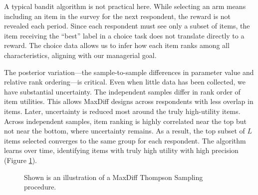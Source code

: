 \documentclass[nonblindrev]{informs3}
\newcommand{\numperset}{L}
\begin{document}
A typical bandit algorithm is not practical here. While selecting an arm means including an item in the survey for the next respondent, the reward is not revealed each period. Since each respondent must see only a subset of items, the item receiving the ``best'' label in a choice task does not translate directly to a reward. The choice data allows us to infer how each item ranks among all characteristics, aligning with our managerial goal.

The posterior variation---the sample-to-sample differences in parameter value and relative rank ordering---is critical. Even when little data has been collected, we have substantial uncertainty. The independent samples differ in rank order of item utilities. This allows MaxDiff designs across respondents with less overlap in items. Later, uncertainty is reduced most around the truly high-utility items. Across independent samples, item ranking is highly correlated near the top but not near the bottom, where uncertainty remains. As a result, the top subset of $\numperset$ items selected converges to the same group for each respondent. The algorithm learns over time, identifying items with truly high utility with high precision (Figure \ref{fig:illustrate_ts}). 

\begin{figure}
\caption{Shown is an illustration of a MaxDiff Thompson Sampling procedure.}
\label{fig:illustrate_ts}
	\begin{center}
    \qquad
    \end{center}
\end{figure}
\end{document}
